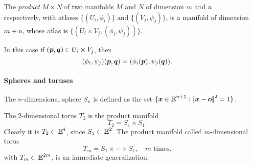 \documentclass{31x47jw}
\begin{document}
The \emph{product} $M\times N$ of two manifolds $M$ and $N$ of
dimension $m$ and $n$ respectively, with atlases $\{(U_{i},
\phi_{i})\}$ and $\{(V_{j}, \psi_{j})\}$, is a manifold of dimension
$m+n$, whose atlas is $\{(U_{i}\times V_{j}, (\phi_{i},\psi_{j}))\}$. 

In this case if $({\mbox{\boldmath $p$}},{\mbox{\boldmath $q$}})\in U_{i}\times V_{j}$, then
\begin{equation}
(\phi_{i},\psi_{j})({\mbox{\boldmath $p$}},{\mbox{\boldmath $q$}}) = (\phi_{i}({\mbox{\boldmath $p$}}),\psi_{j}({\mbox{\boldmath $q$}})).
\label{eq:5:productman}
\end{equation}

\paragraph{Spheres and toruses}

The $n$-dimensional sphere $S_{n}$ is defined as the 
set $\{ {\mbox{\boldmath $x$}}\in\mathbb{I\!\!E}^{n+1} : {\left|\!\left|{\mbox{\boldmath $x$}}-{\mbox{\boldmath $o$}}\right|\!\right|}^{2} = 1 \}$.

The $2$-dimensional torus $T_{2}$ is the product manifold 
\[
T_{2} = S_{1} \times S_{1}.
\]
Clearly it is $T_{2}\subset\mathbb{I\!\!E}^{4}$, since $S_{1}\subset\mathbb{I\!\!E}^{2}$. The
product manifold called  $m$-dimensional torus
\[
T_{m} = S_{1} \times \cdots \times S_{1}, \quad\mbox{$m$ times}.
\]
with $T_{m}\subset\mathbb{I\!\!E}^{2m}$, is an immediate generalization.
\end{document}
